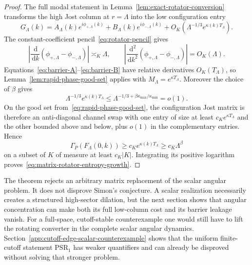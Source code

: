\documentclass[11pt]{article}
\newcommand{\dd}{\,\mathrm d}
\theoremstyle{definition}
\theoremstyle{remark}
\begin{document}
\begin{proof}
The full modal statement in Lemma~\ref{lem:exact-rotator-conversion} transforms
the high Jost column at $r=\Lambda$ into the low configuration entry
\begin{equation}
 G_\Lambda(k)
 =A_\Lambda(k)e^{i\phi_{+,\Lambda}(k)}
  +B_\Lambda(k)e^{i\phi_{-,\Lambda}(k)}
  +O_K\!\left(\Lambda^{-1/3}e^{\kappa(k)T_\Lambda}\right).
 \label{eq:rotator-G}
\end{equation}
The constant-coefficient pencil~\eqref{eq:rotator-pencil} gives
\begin{equation}
 \left|\frac{\dd}{\dd k}
  (\phi_{+,\Lambda}-\phi_{-,\Lambda})\right|\asymp_K\Lambda,
 \qquad
 \left|\frac{\dd^2}{\dd k^2}
  (\phi_{+,\Lambda}-\phi_{-,\Lambda})\right|=O_K(\Lambda).
 \label{eq:rotator-relative-phase}
\end{equation}
Equations~\eqref{eq:barrier-A}--\eqref{eq:barrier-B} have relative derivatives
$O_K(T_\Lambda)$, so Lemma~\ref{lem:rapid-phase-good-set} applies with
$M_\Lambda=e^{\kappa T_\Lambda}$.  Moreover the choice of $\beta$ gives
\begin{equation}
 \Lambda^{-1/3}e^{\kappa(k)T_\Lambda}
 \leq\Lambda^{-1/3+\beta\kappa_{\max}/\kappa_{\min}}=o(1).
 \label{eq:rotator-error-after-barrier}
\end{equation}
On the good set from~\eqref{eq:rapid-phase-good-set}, the configuration Jost
matrix is therefore an anti-diagonal channel swap with one entry of size at
least $c_Ke^{\kappa T_\Lambda}$ and the other bounded above and below, plus
$o(1)$ in the complementary entries.  Hence
\begin{equation}
 \Gamma_P(F_\Lambda(0,k))
 \geq c_Ke^{\kappa(k)T_\Lambda}
 \geq c_K\Lambda^\beta
\end{equation}
on a subset of $K$ of measure at least $c_K|K|$.  Integrating its positive
logarithm proves~\eqref{eq:matrix-rotator-entropy-growth}.
\end{proof}

The theorem rejects an arbitrary matrix replacement of the scalar angular
problem.  It does not disprove Simon's conjecture.  A scalar realization
necessarily creates a structured high-sector dilation, but the next section
shows that angular concentration can make both its full low-column cost and
its barrier leakage vanish.  For a full-space, cutoff-stable counterexample one
would still have to lift the rotating converter in the complete scalar angular
dynamics.  Section~\ref{app:cutoff-edge-scalar-counterexample} shows that the
uniform finite-cutoff statement $\mathrm{PSR}_1$ has weaker quantifiers and can
already be disproved without solving that stronger problem.
\end{document}

